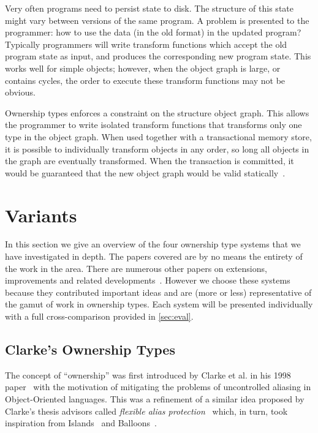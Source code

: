 \documentclass{acm_proc_article-sp}
\begin{document}
Very often programs need to persist state to disk. The structure of this state 
might vary between versions of the same program. A problem is presented to the 
programmer: how to use the data (in the old format) in the updated program? 
Typically programmers will write transform functions which accept the old 
program state as input, and produces the corresponding new program state. This 
works well for simple objects; however, when the object graph is large, or 
contains cycles, the order to execute these transform functions may not be 
obvious.

Ownership types enforces a constraint on the structure object graph. This 
allows the programmer to write isolated transform functions that transforms 
only one type in the object graph. When used together with a transactional 
memory store, it is possible to individually transform objects in any order, so 
long all objects in the graph are eventually transformed. When the transaction 
is committed, it would be guaranteed that the new object graph would be 
valid statically~\cite{boyapati04safejava,boyapati03innerclass}.

\section{Variants}
\label{sec:variants}

In this section we give an overview of the four ownership type systems that we
have investigated in depth. The papers covered are by no means the entirety of
the work in the area. There are numerous other papers on extensions,
improvements and related developments~\cite{clarke13survey}. However we choose
these systems because they contributed important ideas and are (more or less)
representative of the gamut of work in ownership types. Each system will be
presented individually with a full cross-comparison provided in \cref{sec:eval}.

\subsection{Clarke's Ownership Types}
\label{subsec:clarke}

The concept of ``ownership'' was first introduced by Clarke et al. in his 1998
paper~\cite{clarke98ownership} with the motivation of mitigating the problems
of uncontrolled aliasing in Object-Oriented languages. This was a refinement of
a similar idea proposed by Clarke's thesis advisors called \emph{flexible alias
protection}~\cite{noble98alias} which, in turn, took inspiration from
Islands~\cite{hogg91islands} and Balloons~\cite{almeida97balloons}.
\end{document}
